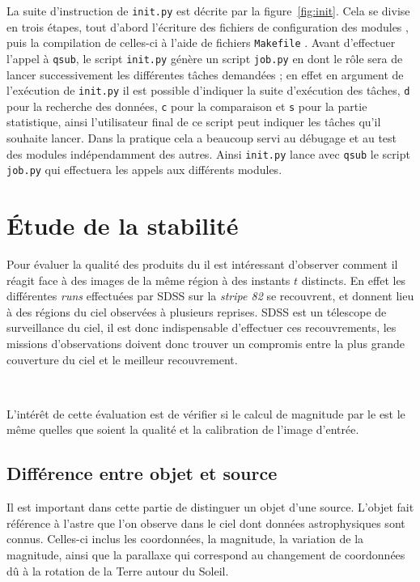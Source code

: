 La suite d'instruction de \texttt{init.py} est décrite par la figure~\ref{fig:init}. Cela se divise en trois étapes, tout d'abord l'écriture des fichiers de configuration des modules \Cpp, puis la compilation de celles-ci à l'aide de fichiers \texttt{Makefile} \cite{MAKE}. Avant d'effectuer l'appel à \texttt{qsub}, le script \texttt{init.py} génère un script \texttt{job.py} en \Python{} dont le rôle sera de lancer successivement les différentes tâches demandées ; en effet en argument de l'exécution de \texttt{init.py} il est possible d'indiquer la suite d'exécution des tâches, \texttt{d} pour la recherche des données, \texttt{c} pour la comparaison et \texttt{s} pour la partie statistique, ainsi l'utilisateur final de ce script peut indiquer les tâches qu'il souhaite lancer. Dans la pratique cela a beaucoup servi au débugage et au test des modules indépendamment des autres. Ainsi \texttt{init.py} lance avec \texttt{qsub} le script \texttt{job.py} qui effectuera les appels aux différents modules.


\section{Étude de la stabilité}

Pour évaluer la qualité des produits du \stack{} il est intéressant d'observer comment il réagit face à des images de la même région à des instants $t$ distincts. En effet les différentes \emph{runs} effectuées par SDSS sur la \emph{stripe 82} se recouvrent, et donnent lieu à des régions du ciel observées à plusieurs reprises. SDSS est un télescope de surveillance du ciel, il est donc indispensable d'effectuer ces recouvrements, les missions d'observations doivent donc trouver un compromis entre la plus grande couverture du ciel et le meilleur recouvrement.

\

L'intérêt de cette évaluation est de vérifier si le calcul de magnitude par le \stack{} est le même quelles que soient la qualité et la calibration de l'image d'entrée.

	\subsection{Différence entre objet et source}

Il est important dans cette partie de distinguer un objet d'une source. L'objet fait référence à l'astre que l'on observe dans le ciel dont données astrophysiques sont connus. Celles-ci inclus les coordonnées, la magnitude, la variation de la magnitude, ainsi que la parallaxe qui correspond au changement de coordonnées dû à la rotation de la Terre autour du Soleil.

